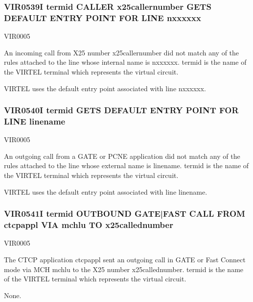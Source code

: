 \documentclass[letterpaper,10pt,english]{sphinxmanual}
\begin{document}
\subsubsection{VIR0539I termid CALLER x25callernumber GETS DEFAULT ENTRY POINT FOR LINE n\sphinxhyphen{}xxxxxx}
\label{\detokenize{messages:vir0539i-termid-caller-x25callernumber-gets-default-entry-point-for-line-n-xxxxxx}}\begin{description}
\sphinxAtStartPar
VIR0005

\sphinxAtStartPar
An incoming call from X25 number x25callernumber did not match any of the rules attached to the line whose internal name is n\sphinxhyphen{}xxxxxx. termid is the name of the VIRTEL terminal which represents the virtual circuit.

\sphinxAtStartPar
VIRTEL uses the default entry point associated with line n\sphinxhyphen{}xxxxxx.

\end{description}


\subsubsection{VIR0540I termid GETS DEFAULT ENTRY POINT FOR LINE linename}
\label{\detokenize{messages:vir0540i-termid-gets-default-entry-point-for-line-linename}}\begin{description}
\sphinxAtStartPar
VIR0005

\sphinxAtStartPar
An outgoing call from a GATE or PCNE application did not match any of the rules attached to the line whose external name is linename. termid is the name of the VIRTEL terminal which represents the virtual circuit.

\sphinxAtStartPar
VIRTEL uses the default entry point associated with line linename.

\end{description}


\subsubsection{VIR0541I termid OUTBOUND GATE|FAST CALL FROM ctcpappl VIA mchlu TO x25callednumber}
\label{\detokenize{messages:vir0541i-termid-outbound-gate-fast-call-from-ctcpappl-via-mchlu-to-x25callednumber}}\begin{description}
\sphinxAtStartPar
VIR0005

\sphinxAtStartPar
The CTCP application ctcpappl sent an outgoing call in GATE or Fast Connect mode via MCH mchlu to the X25 number x25callednumber. termid is the name of the VIRTEL terminal which represents the virtual circuit.

\sphinxAtStartPar
None.

\end{description}
\end{document}
